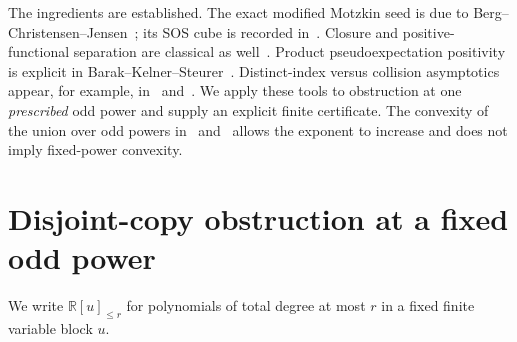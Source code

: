 \documentclass[11pt]{article}
\newcommand{\R}{\mathbb R}
\begin{document}
The ingredients are established. The exact modified Motzkin seed is due
to Berg--Christensen--Jensen~\cite[Lemma~1]{BCJ}; its SOS cube is recorded
in~\cite{OWR,BKR}. Closure and positive-functional separation are classical
as well~\cite[Theorems~3--4]{BCJ}. Product pseudoexpectation positivity is
explicit in Barak--Kelner--Steurer~\cite[Lemma A.5]{BKS}. Distinct-index
versus collision asymptotics appear, for example, in~\cite[Lemma~2.1]{AB}
and~\cite[Proposition~6.4]{BR}. We apply these tools to obstruction at one
\emph{prescribed} odd power and supply an explicit finite certificate.
The convexity of the union over odd powers in~\cite[Theorem~5.3]{BKR}
and~\cite[Theorem~2.2]{Stubborn} allows the exponent to increase and does
not imply fixed-power convexity.

\section{Disjoint-copy obstruction at a fixed odd power}
We write $\R[u]_{\le r}$ for polynomials of total degree at most $r$ in
a fixed finite variable block $u$.
\end{document}

